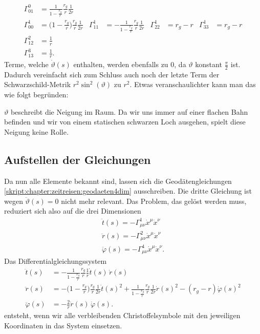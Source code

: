 \begin{refsection}
	\begin{align*}
	\Gamma^0_{01}
	&=
	\frac{1}{1-\displaystyle\frac{r_g}{r}}
	\frac{r_g}{r}
	\frac{1}{2r}
	\\
	\Gamma^1_{00}
	&=
	\biggl(1-\displaystyle\frac{r_g}{r}\biggr)
	\frac{r_g}{r}
	\frac{1}{2r}
	&
	\Gamma^1_{11}
	&=
	-\frac1{1-\displaystyle\frac{r_g}{r}}
	\frac{r_g}{r}
	\frac{1}{2r}
	&
	\Gamma^1_{22}
	&=
	r_g-r
	&
	\Gamma^1_{33}
	&=
	r_g-r
	\\
	\Gamma^2_{12}
	&=
	\frac1r
	\\
	\Gamma^3_{13}
	&=
	\frac1r.
	\end{align*}
	Terme, welche $\dot{\vartheta}(s)$ enthalten, werden ebenfalls zu $0$, da $\vartheta$ konstant $\frac{\pi}{2}$ ist. Dadurch vereinfacht sich zum Schluss auch noch der letzte Term der Schwarzschild-Metrik $r^{2}\sin^{2}(\vartheta)$ zu $r^2$. Etwas veranschaulichter kann man das wie folgt begründen:
	
	 $\vartheta$ beschreibt die Neigung im Raum. Da wir uns immer auf einer flachen Bahn befinden und wir von einem statischen schwarzen Loch ausgehen, spielt diese Neigung keine Rolle.
	
	
	\subsection{Aufstellen der Gleichungen}
	
	Da nun alle Elemente bekannt sind, lassen sich die Geodätengleichungen \ref{skript:chapter:zeitreisen:geodaeten4dim} ausschreiben. Die dritte Gleichung ist wegen $\ddot{\vartheta}(s)=0$ nicht mehr relevant. Das Problem, das gelöst werden muss, reduziert sich also auf die drei Dimensionen
	\begin{align*}
	\ddot{t}(s) = -\Gamma^{1}_{\mu\nu}\dot{x}^{\mu}\dot{x}^{\nu}\\
	\ddot{r}(s) = -\Gamma^{2}_{\mu\nu}\dot{x}^{\mu}\dot{x}^{\nu}\\
	\ddot{\varphi}(s) = -\Gamma^{4}_{\mu\nu}\dot{x}^{\mu}\dot{x}^{\nu}.
	\end{align*} 
	Das Differentialgleichungssystem
	\begin{equation}\label{finaleq}
	\begin{aligned}
	\ddot t(s)
	&=
	-\frac{1}{1-\displaystyle\frac{r_g}{r}}\frac{r_g}{r}\frac{1}{r}\dot t(s)\,\dot r(s)
	\\
	\ddot r(s)
	&=
	-\biggl(1-\frac{r_g}{r}\biggr)\frac{r_g}{r}\frac1{2r}\dot t(s)^2
	+\frac{1}{1-\displaystyle\frac{r_g}{r}} \frac{r_g}{r}\frac1{2r}\dot r(s)^2
	- (r_g-r) \dot\varphi(s)^2
	\\
	\ddot \varphi(s)
	&=
	-\frac2r \dot r(s)\,\dot\varphi(s).
	\end{aligned}
	\end{equation}
	entsteht, wenn wir alle verbleibenden Christoffelsymbole mit den jeweiligen Koordinaten in das System einsetzen.
	

\end{refsection}
